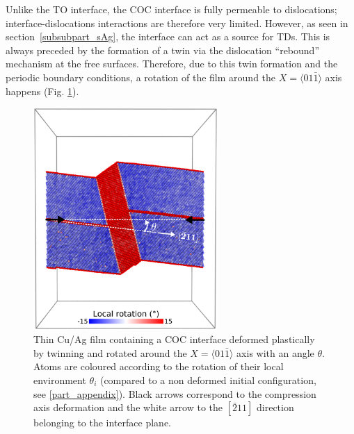 \documentclass[final,3p,times,twocolumn]{elsarticle}
\begin{document}
Unlike the TO interface, the COC interface is fully permeable to dislocations; interface-dislocations interactions are therefore very limited. However, as seen in section~\ref{subsubpart_sAg}, the interface can act as a source for TDs. This is always preceded by the formation of a twin via the dislocation ``rebound'' mechanism at the free surfaces. Therefore, due to this twin formation and the periodic boundary conditions, a rotation of the film around the $X=\langle01\bar{1}\rangle$ axis happens (Fig. \ref{fig_rotation}).
\begin{figure}[!h]
	\begin{center}
		\includegraphics[width=70mm]{Pic/fig_rotation.eps} 
	\end{center}
	\caption{Thin Cu/Ag film containing a COC interface deformed plastically by twinning and rotated around the $X=\langle01\bar{1}\rangle$ axis with an angle $\theta$. Atoms are coloured according to the rotation of their local environment $\theta_{i}$ (compared to a non deformed initial configuration, see \ref{part_appendix}). Black arrows correspond to the compression axis deformation and the white arrow to the $[\bar{2}11]$ direction belonging to the interface plane.}\label{fig_rotation}
\end{figure}
\end{document}

